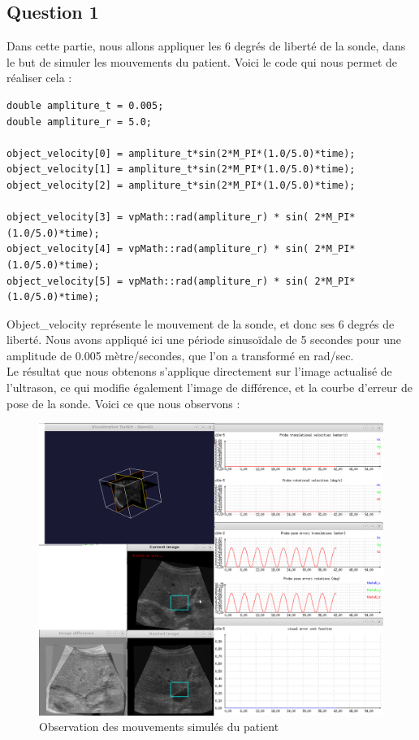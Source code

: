 \documentclass[a4paper,11pt]{article}
\begin{document}
\subsection{Question 1}
Dans cette partie, nous allons appliquer les 6 degr\'es de libert\'e de la sonde, dans le but de simuler les mouvements du patient. Voici le code qui nous permet de r\'ealiser cela :
\begin{verbatim}
double ampliture_t = 0.005;
double ampliture_r = 5.0;

object_velocity[0] = ampliture_t*sin(2*M_PI*(1.0/5.0)*time);
object_velocity[1] = ampliture_t*sin(2*M_PI*(1.0/5.0)*time);
object_velocity[2] = ampliture_t*sin(2*M_PI*(1.0/5.0)*time);

object_velocity[3] = vpMath::rad(ampliture_r) * sin( 2*M_PI*(1.0/5.0)*time);
object_velocity[4] = vpMath::rad(ampliture_r) * sin( 2*M_PI*(1.0/5.0)*time);
object_velocity[5] = vpMath::rad(ampliture_r) * sin( 2*M_PI*(1.0/5.0)*time);
\end{verbatim}

Object\_velocity repr\'esente le mouvement de la sonde, et donc ses 6 degr\'es de libert\'e. Nous avons appliqu\'e ici une p\'eriode sinuso\"idale de 5 secondes pour une amplitude de 0.005 m\`etre/secondes, que l'on a transform\'e en rad/sec.\\

Le r\'esultat que nous obtenons s'applique directement sur l'image actualis\'e de l'ultrason, ce qui modifie \'egalement l'image de diff\'erence, et la courbe d'erreur de pose de la sonde. Voici ce que nous observons :
\begin{figure}[!h]
	\centering
		\includegraphics[width=1.0\textwidth]{./images/question1.png}
	\caption{Observation des mouvements simul\'es du patient}
	\label{mvtPatient}
\end{figure}
\end{document}
